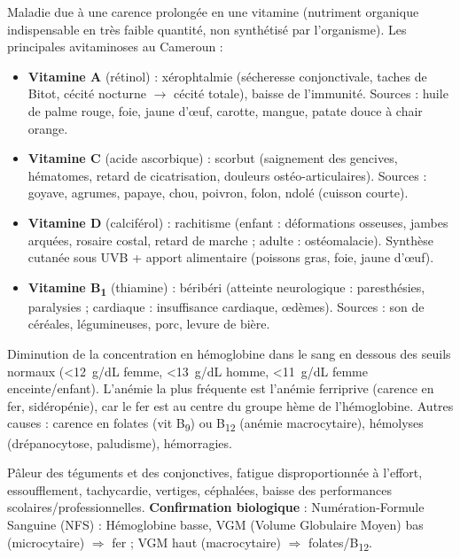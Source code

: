 \documentclass[11pt]{article}
\newcommand{\cle}[1]{{\popxbold\color{popdark}#1}}
\newcounter{popsec}
\newcounter{popsub}
\newcommand{\courssub}[1]{%
  \stepcounter{popsub}%
  \par\vspace{9pt}\noindent{\popxbold\fontsize{11.5}{13}\selectfont\color{popink}{\color{poporange}\thepopsec.\thepopsub}\hspace{6pt}#1}\par\nopagebreak\vspace{4pt}
}
\begin{document}
\courssub{Les avitaminoses et l'anémie}

\begin{definition}[Avitaminose]
Maladie due à une carence prolongée en une \cle{vitamine} (nutriment organique indispensable en très faible quantité, non synthétisé par l'organisme). Les principales avitaminoses au Cameroun :
\begin{itemize}
\item \textbf{Vitamine A} (rétinol) : \cle{xérophtalmie} (sécheresse conjonctivale, taches de Bitot, cécité nocturne $\rightarrow$ cécité totale), baisse de l'immunité. Sources : huile de palme rouge, foie, jaune d'œuf, carotte, mangue, patate douce à chair orange.
\item \textbf{Vitamine C} (acide ascorbique) : \cle{scorbut} (saignement des gencives, hématomes, retard de cicatrisation, douleurs ostéo-articulaires). Sources : goyave, agrumes, papaye, chou, poivron, folon, ndolé (cuisson courte).
\item \textbf{Vitamine D} (calciférol) : \cle{rachitisme} (enfant : déformations osseuses, jambes arquées, rosaire costal, retard de marche ; adulte : ostéomalacie). Synthèse cutanée sous UVB + apport alimentaire (poissons gras, foie, jaune d'œuf).
\item \textbf{Vitamine B\textsubscript{1}} (thiamine) : \cle{béribéri} (atteinte neurologique : paresthésies, paralysies ; cardiaque : insuffisance cardiaque, œdèmes). Sources : son de céréales, légumineuses, porc, levure de bière.
\end{itemize}
\end{definition}

\begin{definition}[Anémie]
Diminution de la concentration en \cle{hémoglobine} dans le sang en dessous des seuils normaux (\SI{<12}{g/dL} femme, \SI{<13}{g/dL} homme, \SI{<11}{g/dL} femme enceinte/enfant). L'anémie la plus fréquente est l'\cle{anémie ferriprive} (carence en fer, sidéropénie), car le fer est au centre du groupe hème de l'hémoglobine. Autres causes : carence en folates (vit B\textsubscript{9}) ou B\textsubscript{12} (anémie macrocytaire), hémolyses (drépanocytose, paludisme), hémorragies.
\end{definition}

\begin{propriete}
Pâleur des téguments et des conjonctives, fatigue disproportionnée à l'effort, essoufflement, tachycardie, vertiges, céphalées, baisse des performances scolaires/professionnelles. \textbf{Confirmation biologique} : Numération-Formule Sanguine (NFS) : Hémoglobine basse, VGM (Volume Globulaire Moyen) bas (microcytaire) $\Rightarrow$ fer ; VGM haut (macrocytaire) $\Rightarrow$ folates/B\textsubscript{12}.
\end{propriete}
\end{document}
